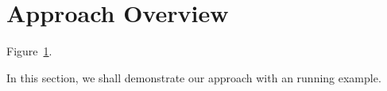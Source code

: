 \section{Approach Overview}

Figure~\ref{}.

In this section, we shall demonstrate our approach with an running example.